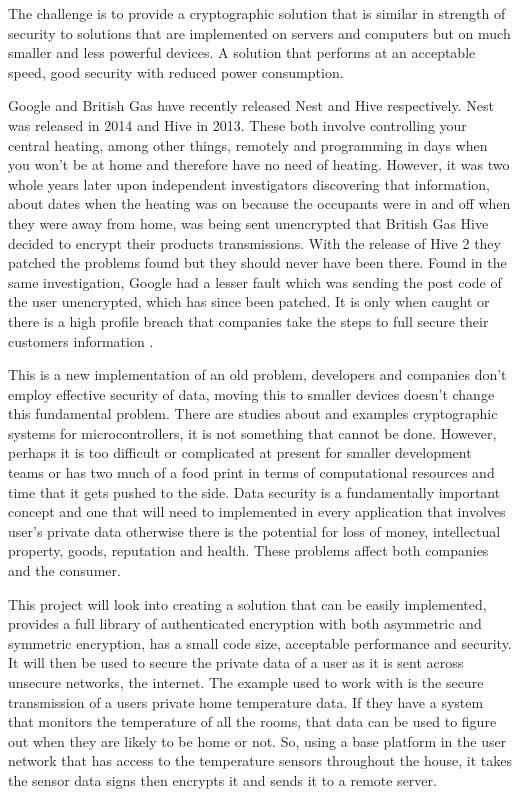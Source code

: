 	The challenge is to provide a cryptographic solution that is similar in strength of security to solutions that are implemented on servers and computers but on much smaller and less powerful devices. A solution that performs at an acceptable speed, good security with reduced power consumption.
	
	Google and British Gas have recently released Nest and Hive respectively. Nest was released in 2014 and Hive in 2013. These both involve controlling your central heating, among other things, remotely and programming in days when you won't be at home and therefore have no need of heating. However, it was two whole years later upon independent investigators discovering that information, about dates when the heating was on because the occupants were in and off when they were away from home, was being sent unencrypted that British Gas Hive decided to encrypt their products transmissions. With the release of Hive 2 they patched the problems found but they should never have been there. Found in the same investigation, Google had a lesser fault which was sending the post code of the user unencrypted, which has since been patched. It is only when caught or there is a high profile breach that companies take the steps to full secure their customers information \cite{which}. 
	
	This is a new implementation of an old problem, developers and companies don't employ effective security of data, moving this to smaller devices doesn't change this fundamental problem. There are studies about and examples cryptographic systems for microcontrollers, it is not something that cannot be done. However, perhaps it is too difficult or complicated at present for smaller development teams or has two much of a food print in terms of computational resources and time that it gets pushed to the side. Data security is a fundamentally important concept and one that will need to implemented in every application that involves user's private data otherwise there is the potential for loss of money, intellectual property, goods, reputation and health. These problems affect both companies and the consumer.
	
	This project will look into creating a solution that can be easily implemented, provides a full library of authenticated encryption with both asymmetric and symmetric encryption, has a small code size, acceptable performance and security. It will then be used to secure the private data of a user as it is sent across unsecure networks, the internet. The example used to work with is the secure transmission of a users private home temperature data. If they have a system that monitors the temperature of all the rooms, that data can be used to figure out when they are likely to be home or not. So, using a base platform in the user network that has access to the temperature sensors throughout the house, it takes the sensor data signs then encrypts it and sends it to a remote server. 
	
	
	